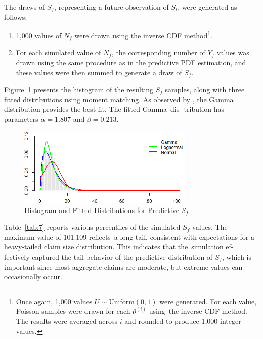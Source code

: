 \documentclass{Class/julia}
\begin{document}
The draws of \( S_f \), representing a future observation of \( S_t \), were generated as follows:

\begin{enumerate}
\item 1,000 values of \( N_f \) were drawn using the inverse CDF method\footnote{Once again, 1,000 values \( U \sim \mathrm{Uniform}(0, 1) \) were generated. For each value, Poisson samples were drawn for each \( \theta^{(i)} \) using~the inverse CDF method. The results were averaged across \( i \) and rounded to produce 1,000 integer values.}.
\item For each simulated value of \( N_f \), the corresponding number of \( Y_f \) values was drawn using the same procedure as in the predictive PDF estimation, and these values were then summed to generate a draw of \( S_f \).
\end{enumerate}

\noindent Figure~\ref{fig:10} presents the histogram of the resulting \( S_f \) samples, along with three fitted distributions using moment matching. As observed by \citet{dudley2006bayesian}, the Gamma distribution provides the best fit. The fitted Gamma~dis- tribution has parameters \( \alpha = 1.807 \) and \( \beta = 0.213 \).

\begin{figure}[!ht]
\centering
\caption{Histogram and Fitted Distributions for Predictive \( S_f \)}
\label{fig:10}
\includegraphics[width=0.75\textwidth]{rytgaard1990/predictive_S_f.png}
\end{figure}

Table~\ref{tab:7} reports various percentiles of the simulated \( S_f \) values. The maximum value of 101.109 reflects~a long tail, consistent with expectations for a heavy-tailed claim size distribution. This indicates that the~simulation ef- fectively captured the tail behavior of the predictive distribution of \( S_f \), which is important since most aggregate claims are moderate, but extreme values can occasionally occur.
\end{document}
